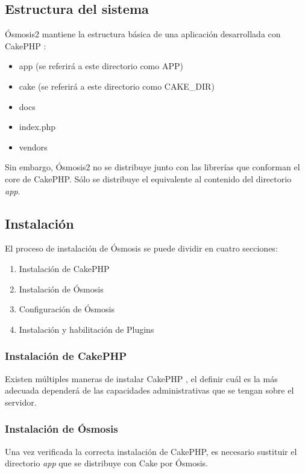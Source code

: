 \subsection{Estructura del sistema}
Ósmosis2 mantiene la estructura básica de una aplicación desarrollada con CakePHP \citep{CakePHP_Folders_2008}:
\begin{itemize}
	\item app  (se referirá a este directorio como APP)
	\item cake (se referirá a este directorio como CAKE\_DIR)
	\item docs
	\item index.php
	\item vendors
\end{itemize}

Sin embargo, Ósmosis2 no se distribuye junto con las librerías que conforman el core de CakePHP. Sólo se distribuye el equivalente al contenido del directorio \emph{app}.\\

\subsection{Instalación}
El proceso de instalación de Ósmosis se puede dividir en cuatro secciones:
\begin{enumerate}
	\item Instalación de CakePHP
	\item Instalación de Ósmosis
	\item Configuración de Ósmosis
	\item Instalación y habilitación de Plugins
\end{enumerate}

\subsubsection{Instalación de CakePHP}
Existen múltiples maneras de instalar CakePHP \citep{CakePHP_Install_2008}, el definir cuál es la más adecuada dependerá de las capacidades administrativas que se tengan sobre el servidor.

\subsubsection{Instalación de Ósmosis}
Una vez verificada la correcta instalación de CakePHP, es necesario sustituir el directorio \emph{app} que se distribuye con Cake por Ósmosis.\\

